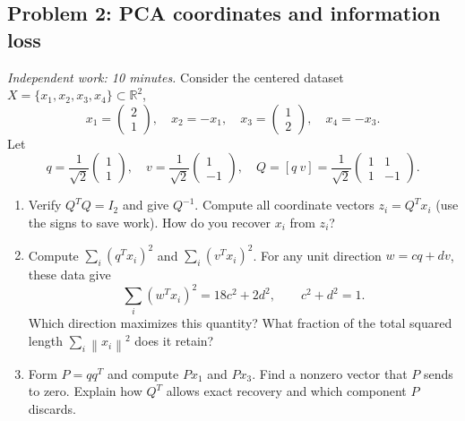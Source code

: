 \documentclass[11pt]{article}
\newcommand{\R}{\mathbb R}
\newcommand{\norm}[1]{\left\lVert#1\right\rVert}
\newcommand{\workingspace}[1]{}
\newcommand{\workingspace}[1]{\vspace{#1}}
\begin{document}
\subsection*{Problem 2: PCA coordinates and information loss}
\noindent\textit{Independent work: 10 minutes.}
Consider the centered dataset $X=\{x_1,x_2,x_3,x_4\}\subset\R^2$,
\[
 x_1=\begin{pmatrix}2\\1\end{pmatrix},\quad x_2=-x_1,\quad
 x_3=\begin{pmatrix}1\\2\end{pmatrix},\quad x_4=-x_3.
\]
Let
\[
 q=\frac1{\sqrt2}\begin{pmatrix}1\\1\end{pmatrix},\quad
 v=\frac1{\sqrt2}\begin{pmatrix}1\\-1\end{pmatrix},\quad
 Q=[q\ v]=\frac1{\sqrt2}\begin{pmatrix}1&1\\1&-1\end{pmatrix}.
\]
\begin{enumerate}
 \item Verify $Q^TQ=I_2$ and give $Q^{-1}$. Compute all coordinate vectors
 $z_i=Q^Tx_i$ (use the signs to save work). How do you recover $x_i$ from $z_i$?
 \item Compute $\sum_i(q^Tx_i)^2$ and $\sum_i(v^Tx_i)^2$.
 For any unit direction $w=cq+dv$, these data give
 \[
 \sum_i(w^Tx_i)^2=18c^2+2d^2,\qquad c^2+d^2=1.
 \]
 Which direction maximizes this quantity? What fraction of the total
 squared length $\sum_i\norm{x_i}^2$ does it retain?
 \item Form $P=qq^T$ and compute $Px_1$ and $Px_3$.
 Find a nonzero vector that $P$ sends to zero.
 Explain how $Q^T$ allows exact recovery and which component $P$ discards.
\end{enumerate}
\workingspace{9cm}
\end{document}
